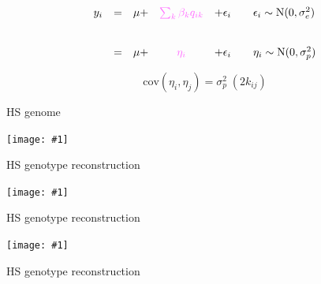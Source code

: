 \documentclass[12pt]{article}
\newcommand{\headsize}{\fontsize{35}{35} \selectfont}
\newcommand{\textsize}{\fontsize{30}{35} \selectfont}
\newcommand{\figh}[2]{\centerline{\texttt{[image: \#1]}}}
\begin{document}
\vspace{3cm}

\color{mywhite} \textsize

$$\begin{array}{lllcl@{\qquad}l}
  y_i & = & \mu + & \textstyle{{\color{mypink} \sum_k \beta_k q_{ik}}} & + \epsilon_i
               & \epsilon_i \sim \text{N}(0, \sigma^2_e) \\[24pt]
  & = & \mu + & {\color{mypink} \eta_i} & + \epsilon_i & \eta_i \sim \text{N}(0, \sigma^2_p)
\end{array}$$

\vspace{2cm}

$$\text{cov}(\eta_i, \eta_j) = \sigma^2_p \; (2 k_{ij})$$






\newpage

\headsize \color{myyellow}
\hfill\begin{minipage}{5.75in}
\centering
HS genome
\end{minipage}

\vspace{5mm}

\figh{Figs/do_genome.pdf}{0.9}


\newpage

\headsize \color{myyellow}
\hfill\begin{minipage}{6.75in}
\centering
HS genotype reconstruction
\end{minipage}

\vspace{5mm}

\figh{Figs/genoprobsA.pdf}{0.9}


\newpage

\headsize \color{myyellow}
\hfill\begin{minipage}{6.75in}
\centering
HS genotype reconstruction
\end{minipage}

\vspace{5mm}

\figh{Figs/genoprobsB.pdf}{0.9}


\newpage

\headsize \color{myyellow}
\hfill\begin{minipage}{6.75in}
\centering
HS genotype reconstruction
\end{minipage}

\vspace{5mm}
\end{document}
